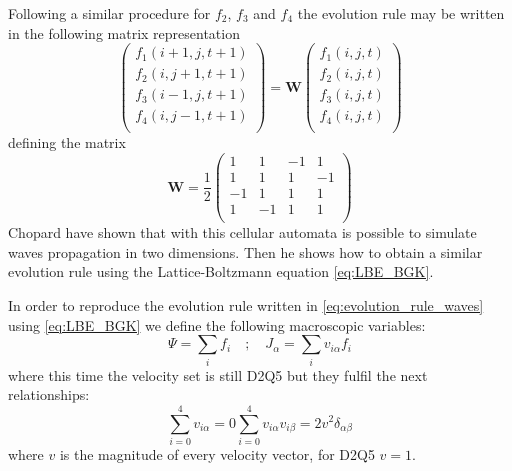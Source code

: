 Following a similar procedure for $f_2$, $f_3$ and $f_4$ the evolution rule may be written in the following matrix representation
\begin{equation}\label{eq:evolution_rule_waves}
    \begin{pmatrix}
        f_1(i+1,j,t+1) \\
        f_2(i,j+1,t+1) \\
        f_3(i-1,j,t+1) \\
        f_4(i,j-1,t+1) \\        
    \end{pmatrix}
    =
    \bm{W}\begin{pmatrix}
        f_1(i,j,t) \\
        f_2(i,j,t) \\
        f_3(i,j,t) \\
        f_4(i,j,t) \\        
    \end{pmatrix}
\end{equation}
defining the matrix 
\begin{equation}\label{eq:W_chopard_evolution_rule}
    \bm{W} = \frac{1}{2}\begin{pmatrix}
        1 & 1 & -1 & 1 \\
        1 & 1 & 1 & -1 \\
        -1 & 1 & 1 & 1 \\
        1 & -1 & 1 & 1 \\
    \end{pmatrix}
\end{equation}
Chopard have shown that with this cellular automata is possible to simulate waves propagation in two dimensions. Then he shows how to obtain a similar evolution rule using the Lattice-Boltzmann equation \ref{eq:LBE_BGK}. 

In order to reproduce the evolution rule written in \ref{eq:evolution_rule_waves} using \ref{eq:LBE_BGK} we define the following macroscopic variables:
\begin{equation}\label{eq:chopard_fields}
    \Psi = \sum_i f_i \quad;\quad J_{\alpha} = \sum_i v_{i\alpha}f_i
\end{equation}
where this time the velocity set is still D2Q5 but they fulfil the next relationships:
\begin{subequations}
\begin{equation}
    \sum_{i=0}^4 v_{i\alpha} = 0
\end{equation}
\begin{equation}
    \sum_{i=0}^4 v_{i\alpha}v_{i\beta} = 2v^2\delta_{\alpha\beta}
\end{equation}
\end{subequations}
where $v$ is the magnitude of every velocity vector, for D2Q5 $v=1$.


